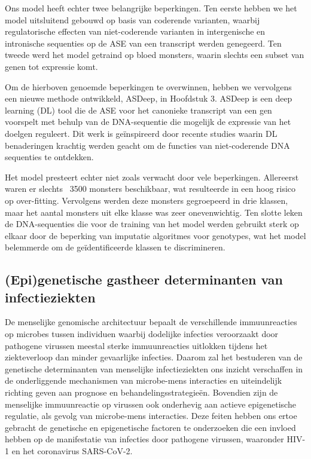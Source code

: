 \documentclass{book}
\begin{document}
\begin{refsection}
Ons model heeft echter twee belangrijke beperkingen.
Ten eerste hebben we het model uitsluitend gebouwd op basis van coderende varianten, waarbij regulatorische effecten van niet-coderende varianten in intergenische en intronische sequenties op de ASE van een transcript werden genegeerd.
Ten tweede werd het model getraind op bloed monsters, waarin slechts een subset van genen tot expressie komt.

Om de hierboven genoemde beperkingen te overwinnen, hebben we vervolgens een nieuwe methode ontwikkeld, ASDeep, in Hoofdstuk 3.
ASDeep is een deep learning (DL) tool die de ASE voor het canonieke transcript van een gen voorspelt met behulp van de DNA-sequentie die mogelijk de expressie van het doelgen reguleert.
Dit werk is geïnspireerd door recente studies waarin DL benaderingen krachtig werden geacht om de functies van niet-coderende DNA sequenties te ontdekken.

Het model presteert echter niet zoals verwacht door vele beperkingen.
Allereerst waren er slechts ~3500 monsters beschikbaar, wat resulteerde in een hoog risico op over-fitting.
Vervolgens werden deze monsters gegroepeerd in drie klassen, maar het aantal monsters uit elke klasse was zeer onevenwichtig.
Ten slotte leken de DNA-sequenties die voor de training van het model werden gebruikt sterk op elkaar door de beperking van imputatie algoritmes voor genotypes, wat het model belemmerde om de geïdentificeerde klassen te discrimineren.

\subsection*{(Epi)genetische gastheer determinanten van infectieziekten}
De menselijke genomische architectuur bepaalt de verschillende immuunreacties op microbes tussen individuen waarbij dodelijke infecties veroorzaakt door pathogene virussen meestal sterke immuunreacties uitlokken tijdens het ziekteverloop dan minder gevaarlijke infecties.
Daarom zal het bestuderen van de genetische determinanten van menselijke infectieziekten ons inzicht verschaffen in de onderliggende mechanismen van microbe-mens interacties en uiteindelijk richting geven aan prognose en behandelingsstrategieën.
Bovendien zijn de menselijke immuunreactie op virussen ook onderhevig aan actieve epigenetische regulatie, als gevolg van microbe-mens interacties.
Deze feiten hebben ons ertoe gebracht de genetische en epigenetische factoren te onderzoeken die een invloed hebben op de manifestatie van infecties door pathogene virussen, waaronder HIV-1 en het coronavirus SARS-CoV-2.


\end{refsection}
\end{document}
